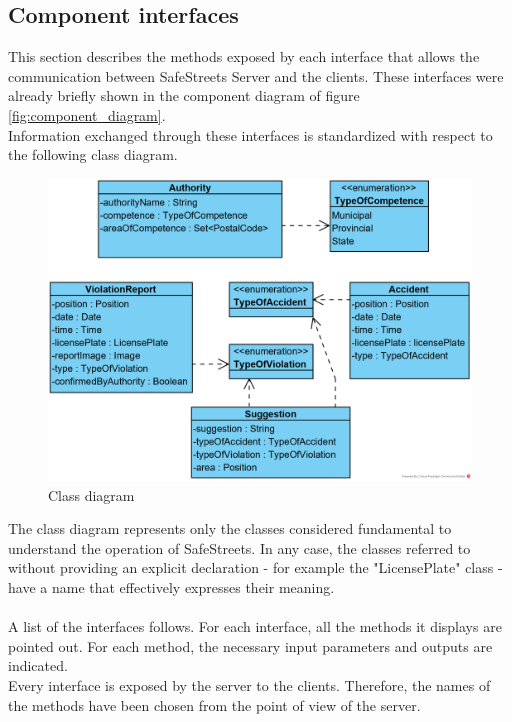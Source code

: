 \documentclass{article}
\begin{document}
		\clearpage
		\subsection{Component interfaces}
		This section describes the methods exposed by each interface that allows the communication between SafeStreets Server and the clients. These interfaces were already briefly shown in the component diagram of figure \ref{fig:component_diagram}.\\
		Information exchanged through these interfaces is standardized with respect to the following class diagram.\\
		
		\begin{figure}[H]
			\includegraphics {diagrams/class_diagram.png}
			\caption[Class diagram]{Class diagram}
			\label{fig:class_diagram}
		\end{figure}
	
		The class diagram represents only the classes considered fundamental to understand the operation of SafeStreets. In any case, the classes referred to without providing an explicit declaration - for example the "LicensePlate" class - have a name that effectively expresses their meaning.\\
		\\
		A list of the interfaces follows. For each interface, all the methods it displays are pointed out. For each method, the necessary input parameters and outputs are indicated.\\
		Every interface is exposed by the server to the clients. Therefore, the names of the methods have been chosen from the point of view of the server.\\
		
\end{document}
